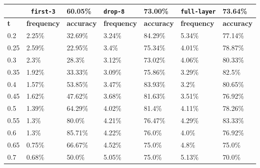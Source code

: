 
\begin{table}[t]
\centering
\begin{tabular}{lllllll} %
\hline

\multicolumn{1}{c}{}& 
\multicolumn{1}{c}{\texttt{first-3}} & \multicolumn{1}{l|}{60.05\%} 
& \multicolumn{1}{l}{\texttt{drop-8}} & \multicolumn{1}{l|}{73.00\%}
& \multicolumn{1}{l}{\texttt{full-layer}} & 73.64\%
\\ \hline
\multicolumn{1}{l|}{\textbf{t}} &
\multicolumn{1}{l|}{\textbf{frequency}} & 
\multicolumn{1}{l|}{\textbf{accuracy}} & 
\multicolumn{1}{l|}{\textbf{frequency}} & 
\multicolumn{1}{l|}{\textbf{accuracy}} & 
\multicolumn{1}{l|}{\textbf{frequency}} & 
\multicolumn{1}{l|}{\textbf{accuracy}} \\ \hline
	\multicolumn{1}{l|}{0.2}&  2.25\% & \multicolumn{1}{l|}{32.69\%}& 3.24\% & \multicolumn{1}{l|}{84.29\%}& 5.34\% & 77.14\%\\ 
\multicolumn{1}{l|}{0.25}&  2.59\% & \multicolumn{1}{l|}{22.95\%}& 3.4\% & \multicolumn{1}{l|}{75.34\%}& 4.01\% & 78.87\%\\ 
\multicolumn{1}{l|}{0.3}&  2.3\% & \multicolumn{1}{l|}{28.3\%}& 3.12\% & \multicolumn{1}{l|}{73.02\%}& 4.06\% & 80.33\%\\ 
\multicolumn{1}{l|}{0.35}&  1.92\% & \multicolumn{1}{l|}{33.33\%}& 3.09\% & \multicolumn{1}{l|}{75.86\%}& 3.29\% & 82.5\%\\ 
\multicolumn{1}{l|}{0.4}&  1.57\% & \multicolumn{1}{l|}{53.85\%}& 3.47\% & \multicolumn{1}{l|}{83.93\%}& 3.2\% & 80.65\%\\ 
\multicolumn{1}{l|}{0.45}&  1.62\% & \multicolumn{1}{l|}{47.62\%}& 3.68\% & \multicolumn{1}{l|}{81.63\%}& 3.51\% & 76.92\%\\ 
\multicolumn{1}{l|}{0.5}&  1.39\% & \multicolumn{1}{l|}{64.29\%}& 4.02\% & \multicolumn{1}{l|}{81.4\%}& 4.11\% & 78.26\%\\ 
\multicolumn{1}{l|}{0.55}&  1.3\% & \multicolumn{1}{l|}{80.0\%}& 4.21\% & \multicolumn{1}{l|}{76.47\%}& 4.29\% & 83.33\%\\ 
\multicolumn{1}{l|}{0.6}&  1.3\% & \multicolumn{1}{l|}{85.71\%}& 4.22\% & \multicolumn{1}{l|}{76.0\%}& 4.0\% & 76.92\%\\ 
\multicolumn{1}{l|}{0.65}&  0.75\% & \multicolumn{1}{l|}{66.67\%}& 4.52\% & \multicolumn{1}{l|}{75.0\%}& 4.8\% & 75.0\%\\ 
\multicolumn{1}{l|}{0.7}&  0.68\% & \multicolumn{1}{l|}{50.0\%}& 5.05\% & \multicolumn{1}{l|}{75.0\%}& 5.13\% & 70.0\%\\ 

\end{tabular}
\end{table}
